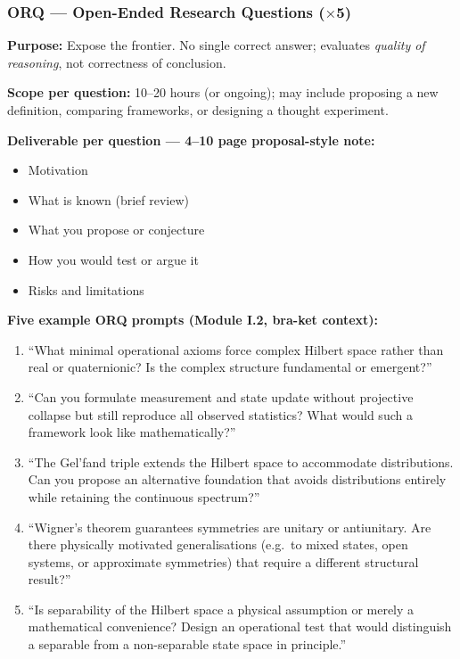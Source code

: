\documentclass[11pt,a4paper]{article}
\begin{document}
\bigskip
\subsubsection{ORQ --- Open-Ended Research Questions ($\times$5)}

\begin{tcolorbox}[researchbox, title={ORQ --- Open-Ended Research Questions \hfill\normalfont 5 questions}]

\textbf{Purpose:} Expose the frontier. No single correct answer; evaluates
\emph{quality of reasoning}, not correctness of conclusion.

\medskip\textbf{Scope per question:} 10--20 hours (or ongoing); may include proposing
a new definition, comparing frameworks, or designing a thought experiment.

\medskip\textbf{Deliverable per question --- 4--10 page proposal-style note:}
\begin{itemize}[leftmargin=1.5em,itemsep=2pt]
  \item Motivation
  \item What is known (brief review)
  \item What you propose or conjecture
  \item How you would test or argue it
  \item Risks and limitations
\end{itemize}

\medskip\textbf{Five example ORQ prompts (Module I.2, bra-ket context):}
\begin{enumerate}[leftmargin=2em,itemsep=4pt]
  \item ``What minimal operational axioms force complex Hilbert space rather than
        real or quaternionic? Is the complex structure fundamental or emergent?''
  \item ``Can you formulate measurement and state update without projective collapse
        but still reproduce all observed statistics? What would such a framework
        look like mathematically?''
  \item ``The Gel'fand triple extends the Hilbert space to accommodate
        distributions. Can you propose an alternative foundation that avoids
        distributions entirely while retaining the continuous spectrum?''
  \item ``Wigner's theorem guarantees symmetries are unitary or antiunitary.
        Are there physically motivated generalisations (e.g.\ to mixed states, open
        systems, or approximate symmetries) that require a different structural
        result?''
  \item ``Is separability of the Hilbert space a physical assumption or merely a
        mathematical convenience? Design an operational test that would distinguish
        a separable from a non-separable state space in principle.''
\end{enumerate}
\end{tcolorbox}
\end{document}
